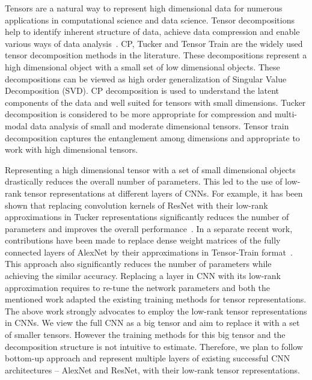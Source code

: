 Tensors are a natural way to represent high dimensional data for numerous applications in computational science and data science. Tensor decompositions help to identify inherent structure of data, achieve data compression and enable various ways of data analysis~\cite{KB-SIAMReview2009}. CP, Tucker and Tensor Train are the widely used tensor decomposition methods in the literature. These decompositions represent a high dimensional object with a small set of low dimensional objects. These decompositions can be viewed as high order generalization of Singular Value Decomposition (SVD). CP decomposition is used to understand the latent components of the data and well suited for tensors with small dimensions. Tucker decomposition is considered to be more appropriate for compression and multi-modal data analysis of small and moderate dimensional tensors. Tensor train decomposition captures the entanglement among dimensions and appropriate to work with high dimensional tensors.


Representing a high dimensional tensor with a set of small dimensional objects drastically reduces the overall number of parameters. This led to the use of low-rank tensor representations at different layers of CNNs. For example, it has been shown that replacing convolution kernels of ResNet with their low-rank approximations in Tucker representations significantly reduces the number of parameters and improves the overall performance~\cite{PSSEG+-ECCV2020}. In a separate recent work, contributions have been made to replace dense weight matrices of the fully connected layers of AlexNet by their approximations in Tensor-Train format~\cite{NPOV-NIPS2015}. This approach also significantly reduces the number of parameters while achieving the similar accuracy. Replacing a layer in CNN with its low-rank approximation requires to re-tune the network parameters and both the mentioned work adapted the existing training methods for tensor representations. The above work strongly advocates to employ the low-rank tensor representations in CNNs. We view the full CNN as a big tensor and aim to replace it with a set of smaller tensors. However the training methods for this big tensor and the decomposition structure is not intuitive to estimate. Therefore, we plan to follow bottom-up approach and represent multiple layers of existing successful CNN architectures -- AlexNet and ResNet, with their low-rank tensor representations.






